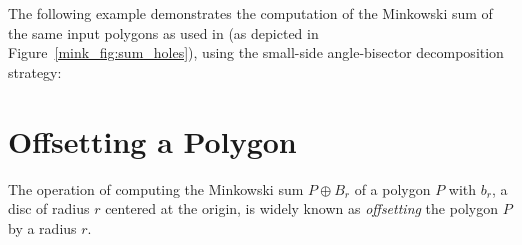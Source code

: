The following example demonstrates the computation of the Minkowski sum
of the same input polygons as used in  (as
depicted in Figure~\ref{mink_fig:sum_holes}), using the small-side
angle-bisector decomposition strategy:


\section{Offsetting a Polygon}
\label{mink_sec:offset}

The operation of computing the Minkowski sum $P \oplus B_r$ of a
polygon $P$ with $b_r$, a disc of radius $r$ centered at the origin,
is widely known as \emph{offsetting} the polygon $P$ by a radius $r$.

